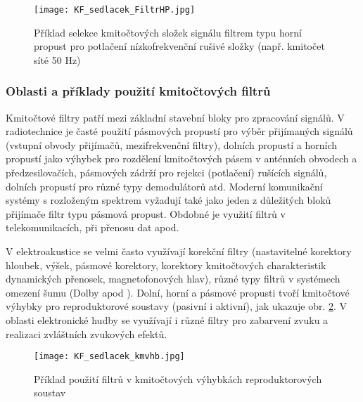       \begin{figure}[ht!]
        \centering
        \texttt{[image: KF\_sedlacek\_FiltrHP.jpg]}
        \caption[Příklad filtru HP]{Příklad selekce kmitočtových složek signálu filtrem typu horní
                 propust pro potlačení nízkofrekvenční rušivé složky (např. kmitočet síté 50 Hz)}
        \label{aes:fig_KF_sedlacek_FiltrHP}    
      \end{figure} 
        
      \subsubsection{Oblasti a příklady použití kmitočtových filtrů}
        Kmitočtové filtry patří mezi základní stavební bloky pro zpracování signálů. V radiotechnice
        je časté použití pásmových propustí pro výběr přijímaných signálů (vstupní obvody přijímačů,
        mezifrekvenční filtry), dolních propustí a horních propustí jako výhybek pro rozdělení
        kmitočtových pásem v anténních obvodech a předzesilovačích, pásmových zádrží pro rejekci
        (potlačení) rušících signálů, dolních propustí pro různé typy demodulátorů atd. Moderní
        komunikační systémy s rozloženým spektrem vyžadují také jako jeden z důležitých bloků
        přijímače filtr typu pásmová propust. Obdobné je využití filtrů v telekomunikacích, při
        přenosu dat apod.
    
        V elektroakustice se velmi často využívají korekční filtry (nastavitelné korektory hloubek,
        výšek, pásmové korektory, korektory kmitočtových charakteristik dynamických přenosek,
        magnetofonových hlav), různé typy filtrů v systémech omezení šumu (Dolby apod ). Dolní,
        horní a pásmové propusti tvoří kmitočtové výhybky pro reproduktorové soustavy (pasivní i
        aktivní), jak ukazuje obr. \ref{aes:fig_KF_sedlacek_kmvhb}. V oblasti elektronické hudby se
        využívají i různé filtry pro zabarvení zvuku a realizaci zvláštních zvukových efektů.
      
        \begin{figure}[ht!]
          \centering
          \texttt{[image: KF\_sedlacek\_kmvhb.jpg]}
          \caption[Příklad použití filtrů v kmitočtových výhybkách reproduktorových
                   soustav]{Příklad použití filtrů v kmitočtových výhybkách reproduktorových
                   soustav}
          \label{aes:fig_KF_sedlacek_kmvhb}    
        \end{figure} 
      
